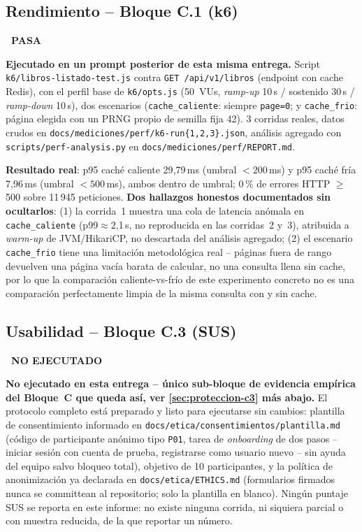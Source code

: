 \documentclass[12pt,a4paper]{article}
\newcommand{\estadoPasa}{\colorbox{verdelight}{\color{white}\small\bfseries\ PASA\ }}
\newcommand{\estadoPendiente}{\colorbox{pendientecolor}{\color{white}\small\bfseries\ NO EJECUTADO\ }}
\begin{document}
\subsection{Rendimiento -- Bloque C.1 (k6)}

\estadoPasa

\textbf{Ejecutado en un prompt posterior de esta misma entrega.} Script
\texttt{k6/libros-listado-test.js} contra \texttt{GET /api/v1/libros}
(endpoint con cache Redis), con el perfil base de \texttt{k6/opts.js}
(50~VUs, \emph{ramp-up} 10\,s / sostenido 30\,s / \emph{ramp-down} 10\,s),
dos escenarios (\texttt{cache\_caliente}: siempre \texttt{page=0}; y
\texttt{cache\_frio}: página elegida con un PRNG propio de semilla fija
42). 3 corridas reales, datos crudos en
\texttt{docs/mediciones/perf/k6-run\{1,2,3\}.json}, análisis agregado con
\texttt{scripts/perf-analysis.py} en
\texttt{docs/mediciones/perf/REPORT.md}.

\textbf{Resultado real}: p95 caché caliente 29{,}79\,ms (umbral
$<200$\,ms) y p95 caché fría 7{,}96\,ms (umbral $<500$\,ms), ambos dentro
de umbral; 0\,\% de errores HTTP $\geq$500 sobre 11\,945 peticiones.
\textbf{Dos hallazgos honestos documentados sin ocultarlos}: (1) la
corrida~1 muestra una cola de latencia anómala en \texttt{cache\_caliente}
(p99$\approx$2{,}1\,s, no reproducida en las corridas~2 y~3), atribuida a
\emph{warm-up} de JVM/HikariCP, no descartada del análisis agregado; (2)
el escenario \texttt{cache\_frio} tiene una limitación metodológica real
-- páginas fuera de rango devuelven una página vacía barata de calcular,
no una consulta llena sin cache, por lo que la comparación
caliente-vs-frío de este experimento concreto no es una comparación
perfectamente limpia de la misma consulta con y sin cache.

\subsection{Usabilidad -- Bloque C.3 (SUS)}

\estadoPendiente

\textbf{No ejecutado en esta entrega -- único sub-bloque de evidencia
empírica del Bloque~C que queda así, ver \autoref{sec:proteccion-c3} más
abajo.} El protocolo completo está preparado y listo para ejecutarse sin
cambios: plantilla de consentimiento informado en
\texttt{docs/etica/consentimientos/plantilla.md} (código de participante
anónimo tipo \texttt{P01}, tarea de \emph{onboarding} de dos pasos --
iniciar sesión con cuenta de prueba, registrarse como usuario nuevo --
sin ayuda del equipo salvo bloqueo total), objetivo de 10 participantes,
y la política de anonimización ya declarada en
\texttt{docs/etica/ETHICS.md} (formularios firmados nunca se committean
al repositorio; solo la plantilla en blanco). Ningún puntaje SUS se
reporta en este informe: no existe ninguna corrida, ni siquiera parcial o
con muestra reducida, de la que reportar un número.
\end{document}
